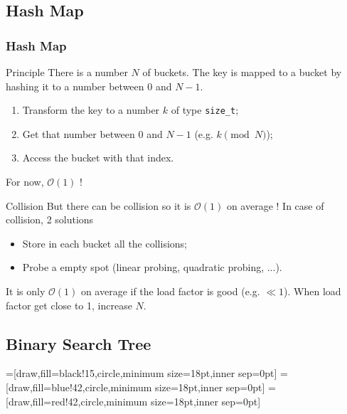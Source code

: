 \documentclass[10pt,svgnames,usenames,table]{beamer} %
\newcommand{\bigoh}{\mathcal{O}}
\begin{document}
\subsection{Hash Map}
\begin{frame}[allowframebreaks]
  \frametitle{Hash Map}
  \begin{block}{Principle}
    There is a number $N$ of buckets. The key is mapped to a bucket by hashing it to a number between $0$ and $N-1$.
    \begin{enumerate}
      \item Transform the key to a number $k$ of type \lstinline|size_t|;
      \item Get that number between $0$ and $N-1$ (e.g. $k \pmod{N}$);
      \item Access the bucket with that index.
    \end{enumerate}
    For now, $\bigoh(1)$ !
  \end{block}
  \begin{block}{Collision}
    But there can be collision so it is $\bigoh(1)$ on average !
    In case of collision, 2 solutions
    \begin{itemize}
      \item Store in each bucket all the collisions;
      \item Probe a empty spot (linear probing, quadratic probing, ...).
    \end{itemize}
  \end{block}
  It is only $\bigoh(1)$ on average if the load factor is good (e.g. $\ll 1$).
  When load factor get close to 1, increase $N$.
\end{frame}

\subsection{Binary Search Tree}

=[draw,fill=black!15,circle,minimum size=18pt,inner sep=0pt]
=[draw,fill=blue!42,circle,minimum size=18pt,inner sep=0pt]
=[draw,fill=red!42,circle,minimum size=18pt,inner sep=0pt]
\end{document}
